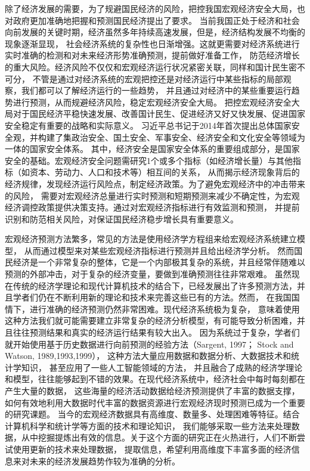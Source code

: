 除了经济发展的需要，为了规避国民经济的风险，把控我国宏观经济安全大局，也对政府更加准确地把握和预测国民经济提出了要求。
当前我国正处于经济和社会向前发展的关键时期，经济虽然多年持续高速发展，但是，经济结构发展不均衡的现象逐渐显现，
社会经济系统的复杂性也日渐增强。这就更需要对经济系统进行实时准确的检测和对未来经济形势准确预测，提前做好准备工作，
防范经济增长的重大风险。经济风险不仅仅和宏观经济运行状况紧密关联，同样和国计民生密不可分，
不管是通过对经济系统的宏观把控还是对经济运行中某些指标的局部观察，我们都可以了解经济运行的一些趋势，
并且通过对经济中的某些重要运行趋势进行预测，从而规避经济风险，稳定宏观经济安全大局。
把控宏观经济安全大局对于国民经济平稳快速发展、改善国计民生、促进经济又好又快发展、促进国家安全稳定有重要的战略和实际意义。
习近平总书记于2014年首次提出总体国家安全观，并构建了集政治安全、国土安全、军事安全、经济安全和文化安全等领域为一体的国家安全体系。
其中，经济安全是国家安全体系的重要组成部分，是国家安全的基础。宏观经济安全问题需研究1个或多个指标（如经济增长量）与其他指标（如资本、劳动力、人口和技术等）相互间的关系，
从而揭示经济现象背后的经济规律，发现经济运行风险点，制定经济政策。为了避免宏观经济中的冲击带来的风险，
需要对宏观经济总量进行实时预测和短期预测来减少不确定性，为宏观经济调控政策提供决策支持。通过对宏观经济指标进行有效监测和预测，
并提前识别和防范相关风险，对保证国民经济稳步增长具有重要意义。

宏观经济预测方法繁多，常见的方法是使用经济学方程组来给宏观经济系统建立模型\cite{郭崇慧2001宏观经济预测模型体系研究}，
从而通过模型来对某些宏观经济指标进行预测并且给出经济学分析。
然而国民经济是一个非常复杂的整体，它是一个内部极其复杂的系统，并且经常伴随难以预测的外部冲击，对于复杂的经济变量，要做到准确预测往往非常艰难。
虽然现在传统的经济学理论和现代计算机技术的结合下，已经发展出了许多预测方法，并且学者们仍在不断利用新的理论和技术来完善这些已有的方法。然而，
在我国国情下，进行准确的经济预测仍然非常困难。现代经济系统极为复杂，
意味着使用这种方法我们就可能需要建立非常复杂的经济分析模型，有可能导致分析困难，并且往往预测结果和真实的经济运行结果有较大出入。
因为系统过于复杂，学者们就开始使用基于历史数据进行向前预测的经验方法（Sargent, 1997\cite{sargent1977business}；
Stock and Watson, 1989\cite{stock1989new},1993\cite{stock1993simple},1999\cite{stock1999forecasting}\cite{stock1999business}），
这种方法大量应用数据和数据分析、大数据技术和统计学知识，
甚至应用了一些人工智能领域的方法\cite{王维2000人工神经网络在非线性经济预测中的应用}，
并且融合了成熟的经济学理论和模型\cite{白仲林2014两类}，往往能够起到不错的效果。在现代经济系统中，经济社会中每时每刻都在产生大量的数据，
这些海量的经济活动数据给经济预测提供了丰富的数据支撑，如何有效地利用大数据时代丰富的数据资源进行宏观经济现时预测已成为一个重要的研究课题。
当今的宏观经济数据具有高维度、数量多、处理困难等特征。结合计算机科学和统计学等方面的技术和理论知识，
我们能够采取一些方法来处理数据，从中挖掘提炼出有效的信息。关于这个方面的研究正在火热进行，人们不断尝试使用更新的技术来处理数据，
提取信息，希望利用高维度下丰富多面的经济信息来对未来的经济发展趋势作较为准确的分析。

